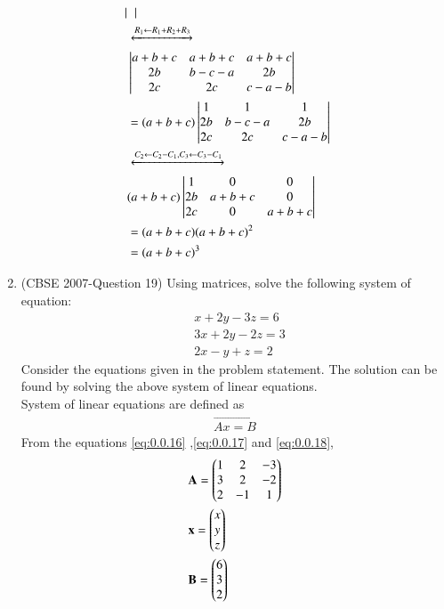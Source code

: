 \documentclass[journal,12pt,twocolumn]{IEEEtran}
\begin{document}
\begin{enumerate}
\begin{align}
\begin{vmatrix}
    \end{vmatrix}\\
& \xleftrightarrow[]{ R_1 \leftarrow R_1 + R_2+R_3}  \nonumber \\
&\begin{vmatrix} a+b+c & a+b+c& a+b+c \\ 2b& b-c-a& 2b\\2c&2c&c-a-b  \end{vmatrix}\\
  &= (a+b+c)\begin{vmatrix} 1 & 1 & 1\\ 2b& b-c-a& 2b\\2c&2c&c-a-b  \end{vmatrix}\\
   & \xleftrightarrow[]{ C_2 \leftarrow C_2- C_1 , C_3 \leftarrow C_3 - C_1} \nonumber \\
   &(a+b+c)\begin{vmatrix} 1 & 0 & 0\\ 2b& a+b+c& 0\\2c&0&a+b+c \end{vmatrix}\\
 &= (a+b+c)(a+b+c)^2  \\
 &= (a+b+c)^3 
  \end{align}
\item (CBSE 2007-Question 19) Using matrices, solve the following system of equation:
\begin{align}
   & x+2y-3z=6  \label{eq:0.0.16}  \\
   &  3x+2y-2z=3  \label{eq:0.0.17}\\
   &  2x-y+z=2   \label{eq:0.0.18}
\end{align}
\solution
Consider the equations given in the problem statement.
The solution can be found by solving the above system of linear equations.\\ 
System of linear equations are defined as 
\begin{align}
\vec{Ax=B} \label{eq:0.0.19}
\end{align}
From the equations \eqref{eq:0.0.16} ,\eqref{eq:0.0.17} and \eqref{eq:0.0.18}, 
\begin{align}
&\vec{A}= \myvec{1 &2 &-3\\3 & 2& -2\\2&-1&1} \\
\medskip
&\vec{x}= \myvec{ x\\ y\\z}\\
\medskip
&\vec{B}= \myvec{6\\3\\2}

\end{align}
\end{enumerate}
\end{document}
